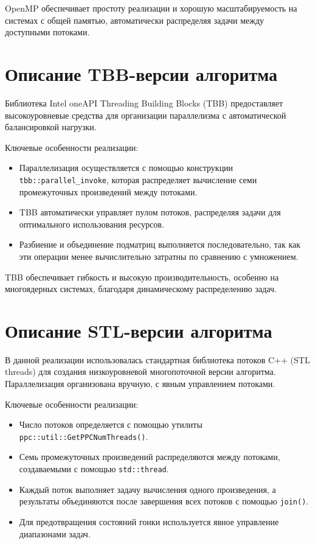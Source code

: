 \documentclass[14pt,a4paper]{extarticle}
\begin{document}
OpenMP обеспечивает простоту реализации и хорошую масштабируемость на системах с общей памятью, автоматически распределяя задачи между доступными потоками.

\section{Описание TBB-версии алгоритма}

Библиотека Intel oneAPI Threading Building Blocks (TBB) предоставляет высокоуровневые средства для организации параллелизма с автоматической балансировкой нагрузки.

Ключевые особенности реализации:

\begin{itemize}
    \item Параллелизация осуществляется с помощью конструкции \texttt{tbb::parallel\_invoke}, которая распределяет вычисление семи промежуточных произведений между потоками.
    \item TBB автоматически управляет пулом потоков, распределяя задачи для оптимального использования ресурсов.
    \item Разбиение и объединение подматриц выполняется последовательно, так как эти операции менее вычислительно затратны по сравнению с умножением.
\end{itemize}

TBB обеспечивает гибкость и высокую производительность, особенно на многоядерных системах, благодаря динамическому распределению задач.

\section{Описание STL-версии алгоритма}

В данной реализации использовалась стандартная библиотека потоков C++ (STL threads) для создания низкоуровневой многопоточной версии алгоритма. Параллелизация организована вручную, с явным управлением потоками.

Ключевые особенности реализации:

\begin{itemize}
    \item Число потоков определяется с помощью утилиты \texttt{ppc::util::GetPPCNumThreads()}.
    \item Семь промежуточных произведений распределяются между потоками, создаваемыми с помощью \texttt{std::thread}.
    \item Каждый поток выполняет задачу вычисления одного произведения, а результаты объединяются после завершения всех потоков с помощью \texttt{join()}.
    \item Для предотвращения состояний гонки используется явное управление диапазонами задач.
\end{itemize}
\end{document}
